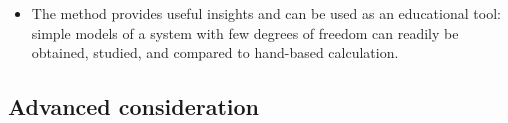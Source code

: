 \documentclass[wes, manuscript]{copernicus}
\begin{document}
\begin{itemize}
\item The method provides useful insights and can be used as an educational tool: simple models of a system with few degrees of freedom can readily be obtained, studied, and compared to hand-based calculation.
\end{itemize}




\subsection{Advanced consideration}
\label{sec:AdvancedConsiderations}
\end{document}
